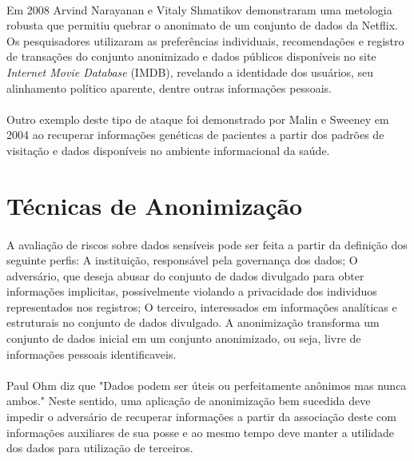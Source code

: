 \paragraph{} Em 2008 Arvind Narayanan e Vitaly Shmatikov demonstraram uma metologia robusta\cite{netflixDeanon}  que permitiu quebrar o anonimato de um conjunto de dados da Netflix. Os pesquisadores utilizaram as preferências individuais, recomendações e registro de transações do conjunto anonimizado e dados públicos disponíveis no site \textit{Internet Movie Database} (IMDB), revelando a identidade dos usuários, seu alinhamento político aparente, dentre outras informações pessoais.

\paragraph{} Outro exemplo deste tipo de ataque foi demonstrado por Malin e Sweeney\cite{malin2004} em 2004 ao recuperar informações genéticas de pacientes a partir dos padrões de visitação e dados disponíveis no ambiente informacional da saúde.

\section{Técnicas de Anonimização}

\paragraph{} A avaliação de riscos sobre dados sensíveis pode ser feita a partir da definição dos seguinte perfis: A instituição, responsável pela governança dos dados; O adversário, que deseja abusar do conjunto de dados divulgado para obter informações implicitas, possivelmente violando a privacidade dos individuos representados nos registros; O terceiro, interessados em informações analíticas e estruturais no conjunto de dados divulgado. A anonimização transforma um conjunto de dados inicial em um conjunto anonimizado, ou seja, livre de informações pessoais identificaveis.

\paragraph{} Paul Ohm\cite{ohm2009} diz que "Dados podem ser úteis ou perfeitamente anônimos mas nunca ambos." Neste sentido, uma aplicação de anonimização bem sucedida deve impedir o adversário de recuperar informações a partir da associação deste com informações auxiliares de sua posse e ao mesmo tempo deve manter a utilidade dos dados para utilização de terceiros. 

